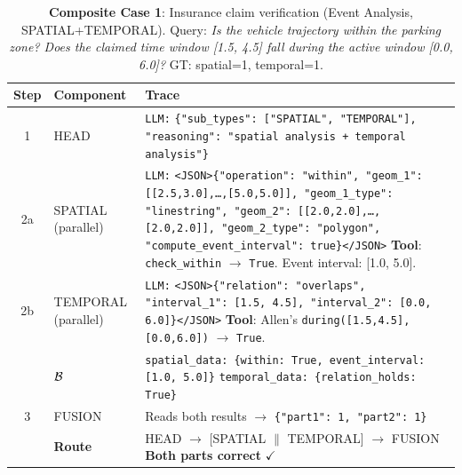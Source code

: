 \begin{table}[!htbp]
\centering
\caption{\textbf{Composite Case 1}: Insurance claim verification (Event Analysis, SPATIAL+TEMPORAL).  Query: \textit{Is the vehicle trajectory within the parking zone? Does the claimed time window [1.5, 4.5] fall during the active window [0.0, 6.0]?}  GT: spatial=1, temporal=1.}
\label{tab:comp_case1}
\small
\begin{tabular}{c l p{9.5cm}}
\toprule
Step & Component & Trace \\
\midrule
1 & HEAD &
\texttt{LLM:} \texttt{\{"sub\_types": ["SPATIAL", "TEMPORAL"], "reasoning": "spatial analysis + temporal analysis"\}} \\
\midrule
2a & SPATIAL \newline (parallel) &
\texttt{LLM:} \texttt{<JSON>\{"operation": "within", "geom\_1": [[2.5,3.0],\ldots,[5.0,5.0]], "geom\_1\_type": "linestring", "geom\_2": [[2.0,2.0],\ldots,[2.0,2.0]], "geom\_2\_type": "polygon", "compute\_event\_interval": true\}</JSON>} \newline
\textbf{Tool}: \texttt{check\_within} $\to$ \texttt{True}. Event interval: [1.0, 5.0]. \\
\midrule
2b & TEMPORAL \newline (parallel) &
\texttt{LLM:} \texttt{<JSON>\{"relation": "overlaps", "interval\_1": [1.5, 4.5], "interval\_2": [0.0, 6.0]\}</JSON>} \newline
\textbf{Tool}: Allen's \texttt{during([1.5,4.5], [0.0,6.0])} $\to$ \texttt{True}. \\
\midrule
& $\mathcal{B}$ &
\texttt{spatial\_data: \{within: True, event\_interval: [1.0, 5.0]\}} \newline
\texttt{temporal\_data: \{relation\_holds: True\}} \\
\midrule
3 & FUSION &
Reads both results $\to$ \texttt{\{"part1": 1, "part2": 1\}} \\
\midrule
& \textbf{Route} & HEAD $\to$ [SPATIAL $\|$ TEMPORAL] $\to$ FUSION \hfill \textbf{Both parts correct} $\checkmark$ \\
\bottomrule
\end{tabular}
\end{table}


